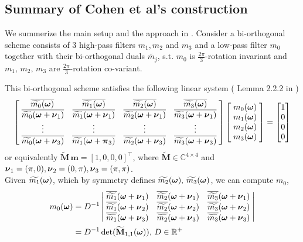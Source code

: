 \subsection{Summary of Cohen et al's construction}\label{subsec: cohen-summary}
We summerize the main setup and the approach in \cite{cohen1993compactly}. Consider a bi-orthogonal scheme consists of 3 high-pass filters $m_1,m_2$ and $m_3$ and a low-pass filter $m_0$ together with their bi-orthogonal duals $\widetilde{m_j}$, s.t.
$m_0$ is $\frac{2\pi}{3}$-rotation invariant and $m_1,\, m_2,\, m_3$ are $\frac{2\pi}{3}$-rotation co-variant.

This bi-orthogonal scheme satisfies the following linear system (
Lemma 2.2.2 in \cite{cohen1993compactly} )
\begin{align}\label{eq: LS}
\begin{bmatrix}
    \,\barm{0} & \barm{1} & \barm{2} & \barm{3}\;  \\
    \;\barmn{0}{1} & \barmn{1}{1}  & \barmn{2}{1}  & \barmn{3}{1}\; \\
    \;\vdots & \vdots & \vdots & \vdots \; \\
    \;\barmn{0}{3} & \barmp{1}{3} & \barmn{2}{3} & \barmn{3}{3}\;
\end{bmatrix}
\begin{bmatrix}
\;\mo{0}\; \\
\;\mo{1}\; \\
\;\mo{2}\; \\
\;\mo{3}\; 
\end{bmatrix} 
=
\begin{bmatrix}
1\\
0\\
0\\
0
\end{bmatrix}
\end{align}
 or equivalently \(\widetilde{\mathbf{M}}\, \mathbf{m} = [1,0,0,0]^\top\), where $\widetilde{\mathbf{M}}\in\mathbb{C}^{4\times 4}$ and $\V{\nu}_1 = (\pi,0),\V{\nu}_2 = (0,\pi),\V{\nu}_3=(\pi,\pi)$.\\
Given $\m{1}$, which by symmetry defines $\m{2},\,\m{3}$, we can compute $m_0$, 
\begin{align}\label{eq: m0-sol}
m_0(\V{\omega}) &= D^{-1}%
\left|
\begin{matrix}
    \; \sbarmn{1}{1}  & \sbarmn{2}{1}  & \sbarmn{3}{1}\; \\
    \; \sbarmn{1}{2}  & \sbarmn{2}{2}  & \sbarmn{3}{2}\; \\
    \; \sbarmn{1}{3} & \sbarmn{2}{3} & \sbarmn{3}{3}\;
\end{matrix}
\right| \notag\\
&= D^{-1}\det(\widetilde{\mathbf{M}}_{1,1}(\V{\omega})), \, D\in \mathbb{R}^+
\end{align}
